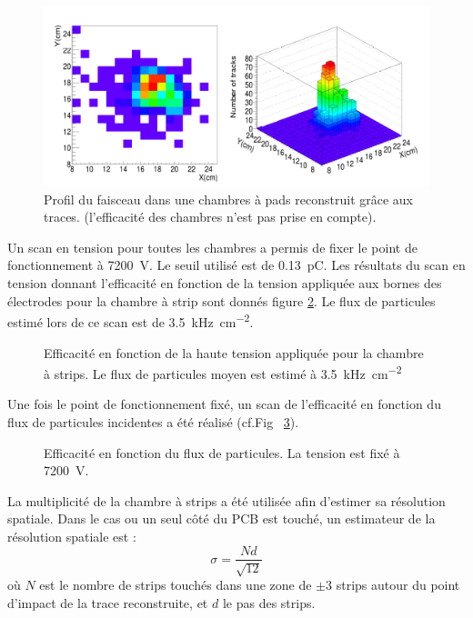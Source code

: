 \begin{figure}[ht!]
	\centering
	\includegraphics[width=0.83\linewidth]{GLA/FaisceauPS.png}
	\caption{Profil du faisceau dans une chambres à pads reconstruit grâce aux traces. (l'efficacité des chambres n'est pas prise en compte).}
	\label{faisceauPS}
\end{figure}

Un scan en tension pour toutes les chambres a permis de fixer le point de fonctionnement à \SI{7200}{\volt}. Le seuil utilisé est de \SI{0.13}{\pico\coulomb}. Les résultats du scan en tension donnant l'efficacité en fonction de la tension appliquée aux bornes des électrodes pour la chambre à strip sont donnés figure \ref{ScanTensionPS}. Le flux de particules estimé lors de ce scan est de \SI{3.5}{\kilo\hertz\per\square\centi\meter}.

\begin{figure}[!ht]
	\centering
	\caption{Efficacité en fonction de la haute tension appliquée pour la chambre à strips. Le flux de particules moyen est estimé à \SI{3.5}{\kilo\hertz\per\square\centi\meter}}
	\label{ScanTensionPS}
\end{figure}

Une fois le point de fonctionnement fixé, un scan de l'efficacité en fonction du flux de particules incidentes a été réalisé (cf.Fig~ \ref{ScanRatePS}).

\begin{figure}[!ht]
	\centering
	\caption{Efficacité en fonction du flux de particules. La tension est fixé à \SI{7200}{\volt}.}
	\label{ScanRatePS}
\end{figure}

La multiplicité de la chambre à strips a été utilisée afin d'estimer sa résolution spatiale. Dans le cas ou un seul côté du PCB est touché, un estimateur de la résolution spatiale est :
\begin{equation}
\sigma=\frac{Nd}{\sqrt{12}}
\end{equation}
où $N$ est le nombre de strips touchés dans une zone de $\pm 3$ strips autour du point d’impact de la trace reconstruite, et $d$ le pas des strips.

